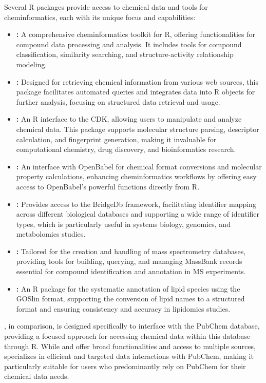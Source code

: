 Several R packages provide access to chemical data and tools for cheminformatics, each with its unique focus and capabilities:

\begin{itemize}
\item
  \textbf{:} A comprehensive cheminformatics toolkit for R, offering functionalities for compound data processing and analysis. It includes tools for compound classification, similarity searching, and structure-activity relationship modeling.
\item
  \textbf{:} Designed for retrieving chemical information from various web sources, this package facilitates automated queries and integrates data into R objects for further analysis, focusing on structured data retrieval and usage.
\item
  \textbf{:} An R interface to the CDK, allowing users to manipulate and analyze chemical data. This package supports molecular structure parsing, descriptor calculation, and fingerprint generation, making it invaluable for computational chemistry, drug discovery, and bioinformatics research.
\item
  \textbf{:} An interface with OpenBabel for chemical format conversions and molecular property calculations, enhancing cheminformatics workflows by offering easy access to OpenBabel's powerful functions directly from R.
\item
  \textbf{:} Provides access to the BridgeDb framework, facilitating identifier mapping across different biological databases and supporting a wide range of identifier types, which is particularly useful in systems biology, genomics, and metabolomics studies.
\item
  \textbf{:} Tailored for the creation and handling of mass spectrometry databases, providing tools for building, querying, and managing MassBank records essential for compound identification and annotation in MS experiments.
\item
  \textbf{:} An R package for the systematic annotation of lipid species using the GOSlin format, supporting the conversion of lipid names to a structured format and ensuring consistency and accuracy in lipidomics studies.
\end{itemize}

, in comparison, is designed specifically to interface with the PubChem database, providing a focused approach for accessing chemical data within this database through R. While  and  offer broad functionalities and access to multiple sources,  specializes in efficient and targeted data interactions with PubChem, making it particularly suitable for users who predominantly rely on PubChem for their chemical data needs.

